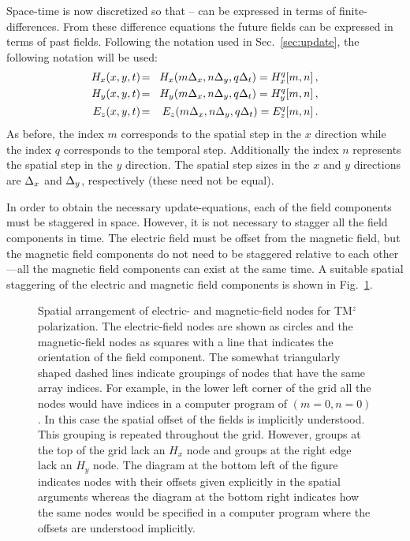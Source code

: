 Space-time is now discretized so that
-- can be expressed in
terms of finite-differences.  From these difference equations the future
fields can be expressed in terms of past fields.  Following the
notation used in Sec.\ \ref{sec:update}, the following notation will be
used: 
\begin{eqnarray}
  H_x(x,y,t) \!&=&\! H_x(m\Delx, n\Dely, q\Delt) =
          \fdtd{H_x}{m,n}{q},  \\
  H_y(x,y,t) \!&=&\! H_y(m\Delx, n\Dely, q\Delt) =
          \fdtd{H_y}{m,n}{q},  \\
  E_z(x,y,t) \!&=&\! E_z(m\Delx, n\Dely, q\Delt) = \fdtd{E_z}{m,n}{q}.
\end{eqnarray}
As before, the index $m$ corresponds to the spatial step in the $x$
direction while the index $q$ corresponds to the temporal step.
Additionally the index $n$ represents the spatial step in the $y$
direction.  The spatial step sizes in the $x$ and $y$ directions are
$\Delta_x$ and $\Delta_y$, respectively (these need not be equal).

In order to obtain the necessary update-equations, each of the field
components must be staggered in space.  However, it is not necessary
to stagger all the field components in time.  The electric field must
be offset from the magnetic field, but the magnetic field components
do not need to be staggered relative to each other---all the magnetic
field components can exist at the same time.  A suitable spatial
staggering of the electric and magnetic field components is shown in
Fig.\ \ref{fig:tmzGrid}.

\begin{figure}
  \begin{center}
\end{center} \caption{Spatial arrangement of electric- and
  magnetic-field nodes for TM$^z$ polarization.  The electric-field
  nodes are shown as circles and the magnetic-field nodes as squares
  with a line that indicates the orientation of the field component.
  The somewhat triangularly shaped dashed lines indicate groupings of
  nodes that have the same array indices.  For example, in the lower
  left corner of the grid all the nodes would have indices in a
  computer program of $(m=0,n=0)$.  In this case the spatial offset of
  the fields is implicitly understood.  This grouping is repeated
  throughout the grid.  However, groups at the top of the grid lack an
  $H_x$ node and groups at the right edge lack an $H_y$ node.  The
  diagram at the bottom left of the figure indicates nodes with their
  offsets given explicitly in the spatial arguments whereas the
  diagram at the bottom right indicates how the same nodes would be
  specified in a computer program where the offsets are understood
  implicitly.}  \label{fig:tmzGrid}
\end{figure}


